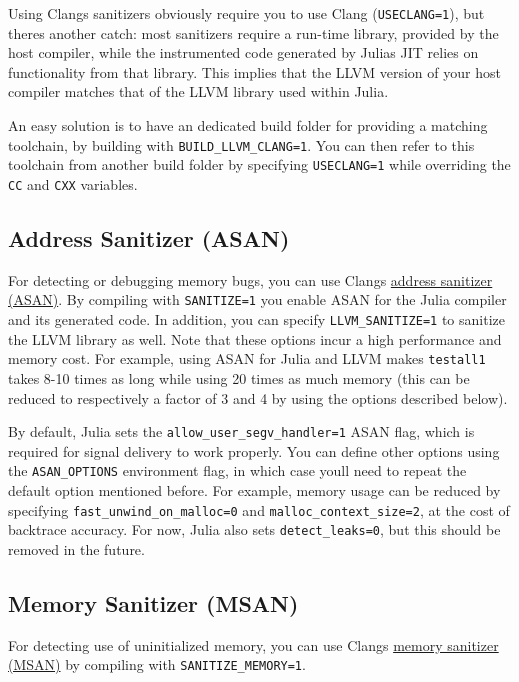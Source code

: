 Using Clang{\textquotesingle}s sanitizers obviously require you to use Clang (\texttt{USECLANG=1}), but there{\textquotesingle}s another catch: most sanitizers require a run-time library, provided by the host compiler, while the instrumented code generated by Julia{\textquotesingle}s JIT relies on functionality from that library. This implies that the LLVM version of your host compiler matches that of the LLVM library used within Julia.



An easy solution is to have an dedicated build folder for providing a matching toolchain, by building with \texttt{BUILD\_LLVM\_CLANG=1}. You can then refer to this toolchain from another build folder by specifying \texttt{USECLANG=1} while overriding the \texttt{CC} and \texttt{CXX} variables.



\hypertarget{1061650975116506198}{}


\subsection{Address Sanitizer (ASAN)}



For detecting or debugging memory bugs, you can use Clang{\textquotesingle}s \href{http://clang.llvm.org/docs/AddressSanitizer.html}{address sanitizer (ASAN)}. By compiling with \texttt{SANITIZE=1} you enable ASAN for the Julia compiler and its generated code. In addition, you can specify \texttt{LLVM\_SANITIZE=1} to sanitize the LLVM library as well. Note that these options incur a high performance and memory cost. For example, using ASAN for Julia and LLVM makes \texttt{testall1} takes 8-10 times as long while using 20 times as much memory (this can be reduced to respectively a factor of 3 and 4 by using the options described below).



By default, Julia sets the \texttt{allow\_user\_segv\_handler=1} ASAN flag, which is required for signal delivery to work properly. You can define other options using the \texttt{ASAN\_OPTIONS} environment flag, in which case you{\textquotesingle}ll need to repeat the default option mentioned before. For example, memory usage can be reduced by specifying \texttt{fast\_unwind\_on\_malloc=0} and \texttt{malloc\_context\_size=2}, at the cost of backtrace accuracy. For now, Julia also sets \texttt{detect\_leaks=0}, but this should be removed in the future.



\hypertarget{11752764117060042950}{}


\subsection{Memory Sanitizer (MSAN)}



For detecting use of uninitialized memory, you can use Clang{\textquotesingle}s \href{http://clang.llvm.org/docs/MemorySanitizer.html}{memory sanitizer (MSAN)} by compiling with \texttt{SANITIZE\_MEMORY=1}.
